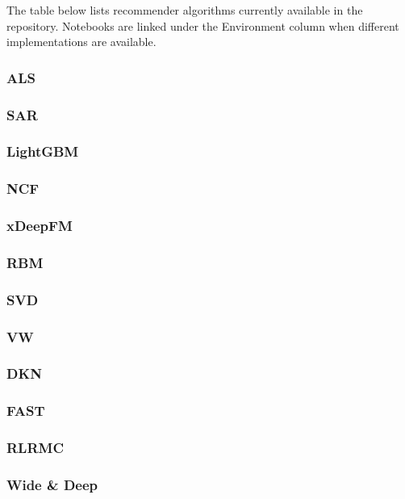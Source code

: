 The table below lists recommender algorithms currently available in the repository. Notebooks are linked under the Environment column when different implementations are available.


\subsubsection{ALS}


\subsubsection{SAR}

\subsubsection{LightGBM}

\subsubsection{NCF}

\subsubsection{xDeepFM}

\subsubsection{RBM}

\subsubsection{SVD}

\subsubsection{VW}

\subsubsection{DKN}

\subsubsection{FAST}

\subsubsection{RLRMC}

\subsubsection{Wide \& Deep}
